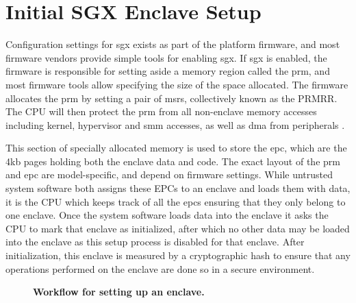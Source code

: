 \section{Initial SGX Enclave Setup}
Configuration settings for \gls{sgx} exists as part of the platform firmware, and most firmware vendors provide simple tools for enabling \gls{sgx}. If \gls{sgx} is enabled, the firmware is responsible for setting aside a memory region called the \gls{prm}, and most firmware tools allow specifying the size of the space allocated. The firmware allocates the \gls{prm} by setting a pair of \glspl{msr}, collectively known as the PRMRR. The CPU will then protect the \gls{prm} from all non-enclave memory accesses including kernel, hypervisor and \gls{smm} accesses, as well as \gls{dma} from peripherals \cite{intel-sgx-explained}. 

This section of specially allocated memory is used to store the \gls{epc}, which are the 4kb pages holding both the enclave data and code. The exact layout of the \gls{prm} and \gls{epc} are model-specific, and depend on firmware settings. While untrusted system software both assigns these EPCs to an enclave and loads them with data, it is the CPU which keeps track of all the \gls{epc}s ensuring that they only belong to one enclave. Once the system software loads data into the enclave it asks the CPU to mark that enclave as initialized, after which no other data may be loaded into the enclave as this setup process is disabled for that enclave. After initialization, this enclave is measured by a cryptographic hash to ensure that any operations performed on the enclave are done so in a secure environment.
\vspace{10 mm}

\begin{figure}[htbp]
\centering

\caption[Setting Up Intel SGX]{\textbf{Workflow for setting up an enclave.}}
\label{fig:sgx-setup}
\end{figure}

